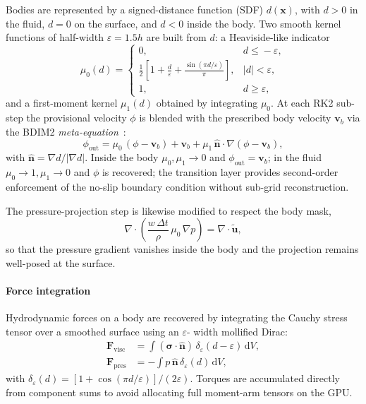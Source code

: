 \documentclass[journal,twoside,10pt]{IEEEtran}
\begin{document}
Bodies are represented by a signed-distance function (SDF)
$d(\mathbf x)$, with $d>0$ in the fluid, $d=0$ on the surface, and
$d<0$ inside the body.  Two smooth kernel functions of half-width
$\varepsilon{=}1.5h$ are built from $d$: a Heaviside-like indicator
\begin{equation}
  \mu_0(d)\!=\!
  \begin{cases}
    0,& d\!\le\!-\varepsilon,\\
    \tfrac12\!\left[1+\tfrac{d}{\varepsilon}
      +\tfrac{\sin(\pi d/\varepsilon)}{\pi}\right],
      & |d|\!<\!\varepsilon,\\
    1,& d\!\ge\!\varepsilon,
  \end{cases}
  \label{eq:mu0}
\end{equation}
and a first-moment kernel $\mu_1(d)$ obtained by integrating
$\mu_0$.  At each RK2 sub-step the provisional velocity $\phi$ is
blended with the prescribed body velocity $\mathbf v_b$ via the
BDIM2 \emph{meta-equation}~\cite{maertens2015accurate,weymouth2011boundary}:
\begin{equation}
  \phi_\mathrm{out}
  = \mu_0\,(\phi-\mathbf v_b)
  + \mathbf v_b
  + \mu_1\,\hat{\mathbf n}\!\cdot\!\nabla(\phi-\mathbf v_b),
  \label{eq:bdim}
\end{equation}
with $\hat{\mathbf n}\!=\!\nabla d/|\nabla d|$.  Inside the body
$\mu_0,\mu_1\!\to\!0$ and $\phi_\mathrm{out}\!=\!\mathbf v_b$; in the
fluid $\mu_0\!\to\!1,\mu_1\!\to\!0$ and $\phi$ is recovered; the
transition layer provides second-order enforcement of the no-slip
boundary condition without sub-grid reconstruction.

The pressure-projection step is likewise modified to respect the
body mask,
\begin{equation}
  \nabla\!\cdot\!\!\left(\frac{w\,\Delta t}{\rho}\,\mu_0\,\nabla p\right)
  = \nabla\!\cdot\!\tilde{\mathbf u},
  \label{eq:poisson}
\end{equation}
so that the pressure gradient vanishes inside the body and the
projection remains well-posed at the surface.

\paragraph{Force integration}
Hydrodynamic forces on a body are recovered by integrating the
Cauchy stress tensor over a smoothed surface using an $\varepsilon$-
width mollified Dirac:
\begin{align}
  \mathbf F_\mathrm{visc}
  &=\int(\bm\sigma\!\cdot\!\hat{\mathbf n})\,
      \delta_\varepsilon(d-\varepsilon)\,\mathrm dV,\\
  \mathbf F_\mathrm{pres}
  &=-\int p\,\hat{\mathbf n}\,
      \delta_\varepsilon(d)\,\mathrm dV,
\end{align}
with
$\delta_\varepsilon(d)=[1+\cos(\pi d/\varepsilon)]/(2\varepsilon)$.
Torques are accumulated directly from component sums to avoid
allocating full moment-arm tensors on the GPU.
\end{document}
